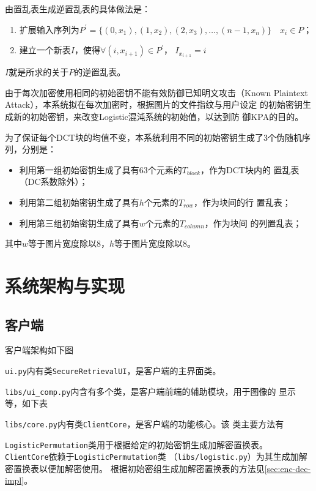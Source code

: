 由置乱表生成逆置乱表的具体做法是：
\begin{enumerate}
  \item 扩展输入序列为$P^\prime = \{(0, x_1), (1, x_2), (2, x_3),
      \dotsc, (n - 1, x_n)\} \quad x_i \in P$；
  \item 建立一个新表$I$，使得$\forall (i, x_{i + 1}) \in P^\prime$，
      $I_{x_{i + 1}} = i$
\end{enumerate}
$I$就是所求的关于$P$的逆置乱表。

由于每次加密使用相同的初始密钥不能有效防御已知明文攻击（Known
Plaintext Attack），本系统拟在每次加密时，根据图片的文件指纹与用户设定
的初始密钥生成新的初始密钥，来改变Logistic混沌系统的初始值，以达到防
御KPA的目的。

为了保证每个DCT块的均值不变，本系统利用不同的初始密钥生成了3个伪随机序
列，分别是：
\begin{itemize}
  \item 利用第一组初始密钥生成了具有63个元素的$T_{block}$，作为DCT块内的
    置乱表（DC系数除外）；
  \item 利用第二组初始密钥生成了具有$h$个元素的$T_{row}$，作为块间的行
    置乱表；
  \item 利用第三组初始密钥生成了具有$w$个元素的$T_{column}$，作为块间
    的列置乱表；
\end{itemize}
其中$w$等于图片宽度除以$8$，$h$等于图片宽度除以$8$。


\section{系统架构与实现}
\label{sec:sys-arch}
\subsection{客户端}
客户端架构如下图


\texttt{ui.py}内有类\texttt{SecureRetrievalUI}，是客户端的主界面类。

\texttt{libs/ui\_comp.py}内含有多个类，是客户端前端的辅助模块，用于图像的
显示等，如下表


\texttt{libs/core.py}内有类\texttt{ClientCore}，是客户端的功能核心。该
类主要方法有


\texttt{LogisticPermutation}类用于根据给定的初始密钥生成加解密置换表。
\texttt{ClientCore}依赖于\texttt{LogisticPermutation}类
（\texttt{libs/logistic.py}）为其生成加解密置换表以便加解密使用。
根据初始密组生成加解密置换表的方法见\ref{sec:enc-dec-impl}。

